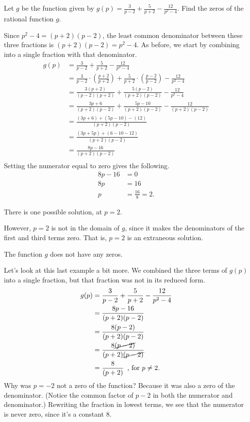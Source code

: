 \documentclass[nooutcomes]{ximera}
\begin{document}
	\begin{example}
		Let $g$ be the function given by $g(p) =  \frac{3}{p-2} + \frac{5}{p+2}- \frac{12}{p^2-4}$. Find the zeros of the rational function $g$.
	
		\begin{explanation} 
			
			Since $p^2-4 = (p+2)(p-2)$, the least common denominator between these three fractions is $(p+2)(p-2) = p^2-4$.
			As before, we start by combining into a single fraction with that denominator.
			\begin{align*}
				g(p) & =  \frac{3}{p-2} + \frac{5}{p+2}- \frac{12}{p^2-4} \\
					& =  \frac{3}{p-2} \cdot \left( \frac{p+2}{p+2}\right)+ \frac{5}{p+2}\cdot \left( \frac{p-2}{p-2}\right)- \frac{12}{p^2-4} \\
					& =  \frac{3(p+2)}{(p-2)(p+2)}+ \frac{5(p-2)}{(p+2)(p-2)} - \frac{12}{p^2-4} \\
					& =  \frac{3p+6}{(p+2)(p-2)}+ \frac{5p-10}{(p+2)(p-2)} - \frac{12}{(p+2)(p-2)} \\
					& =  \frac{(3p+6)+(5p-10)-(12)}{(p+2)(p-2)}\\
					& =  \frac{(3p+5p)+(6-10-12)}{(p+2)(p-2)}\\
					& =  \frac{8p-16}{(p+2)(p-2)}\\
			\end{align*}			
			Setting the numerator equal to zero gives the following.
			\begin{align*}
				8p-16 & = 0 \\
				8p &= 16\\	
				p &= \frac{16}{8}=2.
			\end{align*}

			There is one possible solution, at $p = 2$. 			
			
			However, $p=2$ is not in the domain of $g$, since it makes the denominators of the first and third terms zero. That is, $p=2$ 
			is an extraneous solution.
			
			The function $g$ does not have any zeros.
		\end{explanation}
	\end{example}

	Let's look at this last example a bit more. We combined the three terms of $g(p)$ into a single fraction, but that fraction was not in its reduced form.
	\begin{align*}
		g(p) &= \frac{3}{p-2} + \frac{5}{p+2}- \frac{12}{p^2-4} \\
			&= \frac{8p-16}{(p+2)(p-2)} \\
			&= \frac{8(p-2)}{(p+2)(p-2)} \\
			&= \frac{8\cancel{(p-2)}}{(p+2)\cancel{(p-2)}} \\
			&= \frac{8}{(p+2)} \, \text{ , for  } p \neq 2.
	\end{align*}
	Why was $p=-2$ not a zero of the function? Because it was also a zero of the denominator. 
	(Notice the common factor of $p-2$ in both the numerator and denominator.) 
	Rewriting the fraction in lowest terms, we see that the numerator is never zero, since it's a constant $8$.
\end{document}
